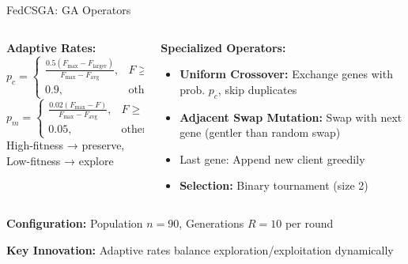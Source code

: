 \documentclass{beamer}
\begin{document}
\begin{frame}{FedCSGA: GA Operators}
\begin{columns}[T]
\begin{column}{0.48\textwidth}
\textbf{Adaptive Rates:}
\begin{equation*}
p_c = \begin{cases}
\frac{0.5(F_{\max} - F_{\text{larger}})}{F_{\max} - F_{\text{avg}}}, & F \geq F_{\text{avg}} \\
0.9, & \text{otherwise}
\end{cases}
\end{equation*}
\begin{equation*}
p_m = \begin{cases}
\frac{0.02(F_{\max} - F)}{F_{\max} - F_{\text{avg}}}, & F \geq F_{\text{avg}} \\
0.05, & \text{otherwise}
\end{cases}
\end{equation*}
\tiny High-fitness → preserve, Low-fitness → explore
\end{column}

\begin{column}{0.48\textwidth}
\textbf{Specialized Operators:}
\begin{itemize}
\item \textbf{Uniform Crossover:} Exchange genes with prob. $p_c$, skip duplicates
\item \textbf{Adjacent Swap Mutation:} Swap with next gene (gentler than random swap)
\item Last gene: Append new client greedily
\item \textbf{Selection:} Binary tournament (size 2)
\end{itemize}
\end{column}
\end{columns}

\vspace{0.3cm}
\textbf{Configuration:} Population $n=90$, Generations $R=10$ per round

\textbf{Key Innovation:} Adaptive rates balance exploration/exploitation dynamically
\end{frame}
\end{document}
